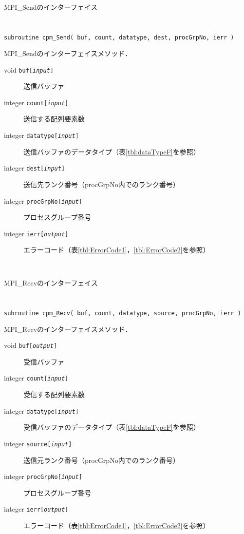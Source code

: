 \begin{spacing}{0.8}
\begin{itembox}[l]{MPI\_Sendのインターフェイス}
{\tt
\begin{verbatim}
subroutine cpm_Send( buf, count, datatype, dest, procGrpNo, ierr )
\end{verbatim}
}
MPI\_Sendのインターフェイスメソッド．
\begin{description}
\item[void    {\tt buf[{\it input}]}] 送信バッファ
\item[integer {\tt count[{\it input}]}] 送信する配列要素数
\item[integer {\tt datatype[{\it input}]}] 送信バッファのデータタイプ（表\ref{tbl:dataTypeF}を参照）
\item[integer {\tt dest[{\it input}]}] 送信先ランク番号（procGrpNo内でのランク番号）
\item[integer {\tt procGrpNo[{\it input}]}] プロセスグループ番号
\item[integer {\tt ierr[{\it output}]}] エラーコード（表\ref{tbl:ErrorCode1}，\ref{tbl:ErrorCode2}を参照）
\end{description}
\end{itembox}\\
\end{spacing}

\begin{spacing}{0.8}
\begin{itembox}[l]{MPI\_Recvのインターフェイス}
{\tt
\begin{verbatim}
subroutine cpm_Recv( buf, count, datatype, source, procGrpNo, ierr )
\end{verbatim}
}
MPI\_Recvのインターフェイスメソッド．
\begin{description}
\item[void    {\tt buf[{\it output}]}] 受信バッファ
\item[integer {\tt count[{\it input}]}] 受信する配列要素数
\item[integer {\tt datatype[{\it input}]}] 受信バッファのデータタイプ（表\ref{tbl:dataTypeF}を参照）
\item[integer {\tt source[{\it input}]}] 送信元ランク番号（procGrpNo内でのランク番号）
\item[integer {\tt procGrpNo[{\it input}]}] プロセスグループ番号
\item[integer {\tt ierr[{\it output}]}] エラーコード（表\ref{tbl:ErrorCode1}，\ref{tbl:ErrorCode2}を参照）
\end{description}
\end{itembox}\\
\end{spacing}

